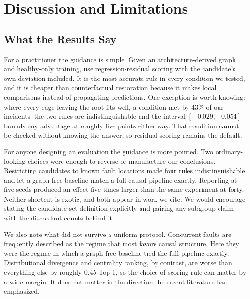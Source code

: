 \documentclass[conference]{IEEEtran}
\begin{document}
\section{Discussion and Limitations}
\label{sec:discussion}

\subsection{What the Results Say}
For a practitioner the guidance is simple. Given an architecture-derived graph and healthy-only training, use regression-residual scoring with the candidate's own deviation included. It is the most accurate rule in every condition we tested, and it is cheaper than counterfactual restoration because it makes local comparisons instead of propagating predictions. One exception is worth knowing: where every edge leaving the root fits well, a condition met by 43\% of our incidents, the two rules are indistinguishable and the interval $[-0.029,+0.054]$ bounds any advantage at roughly five points either way. That condition cannot be checked without knowing the answer, so residual scoring remains the default.

For anyone designing an evaluation the guidance is more pointed. Two ordinary-looking choices were enough to reverse or manufacture our conclusions. Restricting candidates to known fault locations made four rules indistinguishable and let a graph-free baseline match a full causal pipeline exactly. Reporting at five seeds produced an effect five times larger than the same experiment at forty. Neither shortcut is exotic, and both appear in work we cite. We would encourage stating the candidate-set definition explicitly and pairing any subgroup claim with the discordant counts behind it.

We also note what did not survive a uniform protocol. Concurrent faults are frequently described as the regime that most favors causal structure. Here they were the regime in which a graph-free baseline tied the full pipeline exactly. Distributional divergence and centrality ranking, by contrast, are worse than everything else by roughly $0.45$ Top-1, so the choice of scoring rule can matter by a wide margin. It does not matter in the direction the recent literature has emphasized.
\end{document}
